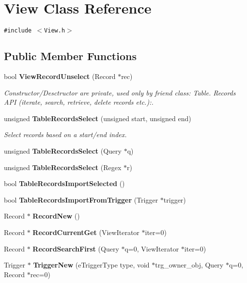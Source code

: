 \section{View Class Reference}
\label{classView}
{\tt \#include $<$View.h$>$}

\subsection*{Public Member Functions}
\begin{CompactItemize}
\item 
bool {\bf View\-Record\-Unselect} (Record $\ast$rec)
\begin{CompactList}\small\item\em Constructor/Desctructor are private, used only by friend class: Table. Records API (iterate, search, retrieve, delete records etc.):. \item\end{CompactList}\item 
unsigned {\bf Table\-Records\-Select} (unsigned start, unsigned end)
\begin{CompactList}\small\item\em Select records based on a start/end index. \item\end{CompactList}\item 
unsigned {\bf Table\-Records\-Select} (Query $\ast$q)\label{classView_a2}

\item 
unsigned {\bf Table\-Records\-Select} (Regex $\ast$r)\label{classView_a3}

\item 
bool {\bf Table\-Records\-Import\-Selected} ()\label{classView_a4}

\item 
bool {\bf Table\-Records\-Import\-From\-Trigger} (Trigger $\ast$trigger)\label{classView_a5}

\item 
Record $\ast$ {\bf Record\-New} ()\label{classView_a6}

\item 
Record $\ast$ {\bf Record\-Current\-Get} (View\-Iterator $\ast$iter=0)\label{classView_a7}

\item 
Record $\ast$ {\bf Record\-Search\-First} (Query $\ast$q=0, View\-Iterator $\ast$iter=0)\label{classView_a8}

\item 
Trigger $\ast$ {\bf Trigger\-New} (e\-Trigger\-Type type, void $\ast$trg\_\-owner\_\-obj, Query $\ast$q=0, Record $\ast$rec=0)\label{classView_a9}


\end{CompactItemize}
